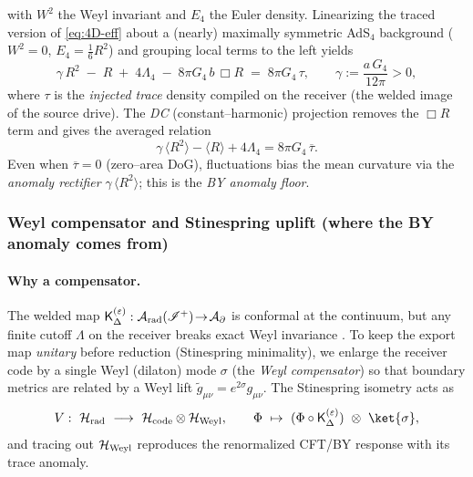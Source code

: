 \documentclass[10pt]{article}
\theoremstyle{definition}
\theoremstyle{plain}
\begin{document}
with $W^2$ the Weyl invariant and $E_4$ the Euler density. Linearizing the traced version of
\eqref{eq:4D-eff} about a (nearly) maximally symmetric AdS$_4$ background ($W^2=0$, $E_4=\tfrac16R^2$)
and grouping local terms to the left yields
\begin{equation}
\gamma\,R^2\;-\;R\;+\;4\Lambda_4\;-\;8\pi G_4\,b\,\Box R
\;=\;8\pi G_4\,\tau,
\qquad
\gamma:=\frac{a\,G_4}{12\pi}>0,
\label{eq:trace-eq}
\end{equation}
where $\tau$ is the \emph{injected trace} density compiled on the receiver (the welded
image of the source drive). The \emph{DC} (constant–harmonic) projection removes the $\Box R$
term and gives the averaged relation
\begin{equation}
\gamma\,\langle R^2\rangle - \langle R\rangle + 4\Lambda_4
= 8\pi G_4\,\overline{\tau}.
\label{eq:DC-trace}
\end{equation}
Even when $\overline{\tau}=0$ (zero–area DoG), fluctuations bias the mean curvature via the
\emph{anomaly rectifier} $\gamma\,\langle R^2\rangle$; this is the \emph{BY anomaly floor}.

\subsubsection*{Weyl compensator and Stinespring uplift (where the BY anomaly comes from)}
\label{subsubsec:weyl-compensator-stinespring}

\paragraph{Why a compensator.}\label{par:uom-main-040}
The welded map ${\sf K}^{(\varepsilon)}_\Delta:\mathcal A_{\rm rad}(\mathscr I^+)\!\to\!\mathcal A_\partial$
is conformal at the continuum, but any finite cutoff $\Lambda$ on the receiver breaks exact
Weyl invariance \cite{HenningsonSkenderis1998,deHaroSkenderisSolodukhin2001,Skenderis2002HR}. To keep the export map \emph{unitary} before reduction (Stinespring minimality),
we enlarge the receiver code by a single Weyl (dilaton) mode $\sigma$ (the \emph{Weyl compensator})
so that boundary metrics are related by a Weyl lift $\tilde g_{\mu\nu}=e^{2\sigma} g_{\mu\nu}$.
The Stinespring isometry acts as
\[
V:\ \mathcal H_{\rm rad}\ \longrightarrow\ \mathcal H_{\rm code}\otimes\mathcal H_{\rm Weyl},
\qquad
\Phi\ \mapsto\ (\Phi\circ{\sf K}^{(\varepsilon)}_\Delta)\ \otimes\ \ket{\sigma},
\]
and tracing out $\mathcal H_{\rm Weyl}$ reproduces the renormalized CFT/BY response with its
trace anomaly.
\end{document}
